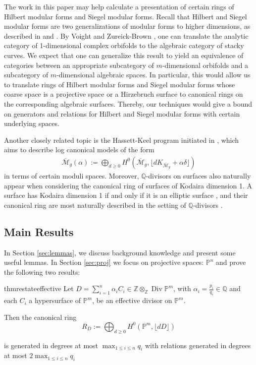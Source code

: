 \documentclass{amsart}
\theoremstyle{plain}
\theoremstyle{definition}
\theoremstyle{remark}
\numberwithin{equation}{section}
\newcommand\ssec{\subsection}
\newcommand\bq{{\mathbb Q}}
\newcommand\bp{{\mathbb P}}
\newcommand\bz{{\mathbb Z}}
\DeclareMathOperator\di{Div}
\begin{document}
The work in this paper may help calculate a presentation of certain rings of
Hilbert 
modular forms and Siegel modular forms. Recall that Hilbert and Siegel 
modular forms are two generalizations of modular forms to higher dimensions,
as described in \cite{geer:siegel-modular} and \cite{bruinier:hilbert-modular}.
By Voight and Zureick-Brown \cite[Proposition 6.1.5]{vzb:stacky}, 
one can translate the analytic category of 1-dimensional complex orbifolds to
the algebraic category of stacky curves. 
We expect that one can generalize this result to yield an equivalence of
categories between an appropriate subcategory of $m$-dimensional orbifolds and
a subcategory of $m$-dimensional algebraic spaces.
In particular, this would allow us to translate rings of Hilbert modular forms
and Siegel modular forms whose coarse space is a projective space or a
Hirzebruch surface to canonical rings on the corresponding algebraic surfaces.
Thereby, our techniques would give a bound on generators and relations for
Hilbert and Siegel modular forms with certain underlying spaces.

Another closely related topic is the Hassett-Keel program 
initiated in \cite{hassett:classical-and-minimal-models}, which aims to describe log canonical models of the form
\begin{align*}
	\overline {\mathscr M}_g(\alpha) := \bigoplus_{d \geq 0}H^0 \left(
	\overline {\mathscr M}_g, \lfloor d K_{\overline{\mathscr M}_g} +
	\alpha\delta \rfloor  \right) 
\end{align*}
in terms of certain moduli spaces. Moreover, $\bq$-divisors on surfaces also naturally
appear when considering the canonical ring of surfaces of Kodaira dimension 1.
A surface has Kodaira dimension 1 if and only if it is an elliptic surface \cite[p. 244]{
barthHPV:compactComplexSurfaces}, and
their canonical ring are most naturally described in the setting of
$\bq$-divisors \cite[Chapter V, Theorem 12.1]{barthHPV:compactComplexSurfaces}. 

\ssec{Main Results}

In Section \ref{sec:lemmas}, we discuss background knowledge and present some useful lemmas.  In Section \ref{sec:proj} we focus on projective spaces: $\mathbb{P}^n$ and prove the following two results:
\begin{restatable}{thm}{restateeffective}
\label{thm:proj-effective-intro}
Let $D = \sum_{i = 1}^{n} \alpha_i C_i \in \bz \otimes_\bz \di \bp^m$, with $\alpha_i =
\frac{p_i}{q_i} \in \bq$ and each $C_i$ a hypersurface of
$\bp^m$, be an effective divisor on $\bp^m$.

Then the canonical ring
\[
	R_D := \bigoplus_{d \geq 0} H^0(\bp^m, \lfloor dD \rfloor)
\]

\noindent
is generated in degrees at most $\max_{1 \leq i \leq n}{q_i}$ with
relations generated in degrees at most $2 \max_{1 \leq i \leq n}{q_i}$
\end{restatable}
\end{document}
